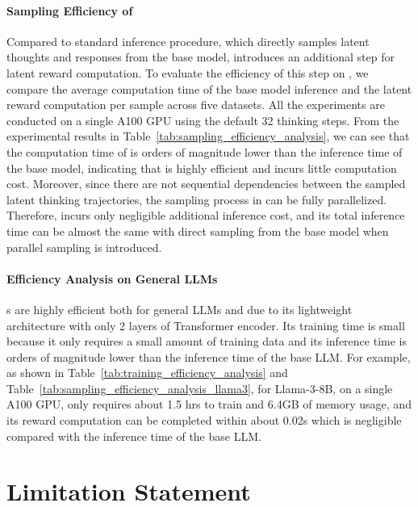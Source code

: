 \documentclass{article} %
\begin{document}
\paragraph*{Sampling Efficiency of \LTO}
%
Compared to standard inference procedure, which directly samples latent thoughts and responses from the base model, \LTO introduces an additional step for latent reward computation. 
%
To evaluate the efficiency of this step on \LRLM, we compare the average computation time of the base model inference and
the latent reward computation per sample across five datasets. 
%
All the experiments are conducted on a single A100 GPU using the default 32 thinking steps. 
%
From the experimental results in Table~\ref{tab:sampling_efficiency_analysis}, we can see that the computation time of \LRM is orders of magnitude lower than the inference time of the base model, indicating that \LRM is highly efficient and incurs little computation cost. 
%
Moreover, since there are not sequential dependencies between the sampled latent thinking trajectories, the sampling process in \LTO can be fully parallelized. 
%
Therefore, \LTO incurs only negligible additional inference cost, and its total inference time can be almost the same with direct sampling from the base model when parallel sampling is introduced.
%


\paragraph*{Efficiency Analysis on General LLMs}
{\LRM}s are highly efficient both for general LLMs and \LRLM due to its lightweight architecture with only 2 layers of Transformer encoder. Its training time is small because it only requires a small amount of training data and its inference time is orders of magnitude lower than the inference time of the base LLM. For example, as shown in Table~\ref{tab:training_efficiency_analysis} and Table~\ref{tab:sampling_efficiency_analysis_llama3}, for Llama-3-8B, on a single A100 GPU, \LRM only requires about 1.5 hrs to train and 6.4GB of memory usage, and its reward computation can be completed within about 0.02s which is negligible compared with the inference time of the base LLM.
\section{Limitation Statement}
\label{appendix:limitation_statement}
\end{document}
